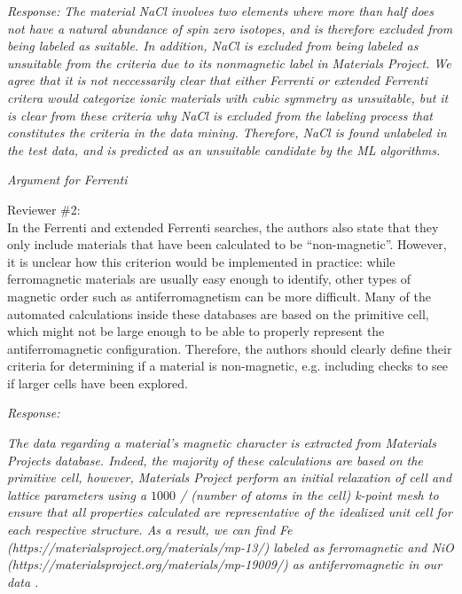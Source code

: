 \documentclass[11pt, a4paper]{letter} %
\begin{document}
\textit{Response:} 
\textit{The material NaCl involves two elements where more than half does not have a natural abundance of spin zero isotopes, and is therefore excluded from being labeled as suitable. In addition, NaCl is excluded from being labeled as unsuitable from the criteria due to its nonmagnetic label in Materials Project. We agree that it is not neccessarily clear that either Ferrenti or extended Ferrenti critera would categorize ionic materials with cubic symmetry as unsuitable, but it is clear from these criteria why NaCl is excluded from the labeling process that constitutes the criteria in the data mining. Therefore, NaCl is found unlabeled in the test data, and is predicted as an unsuitable candidate by the ML algorithms.}

\textit{Argument for Ferrenti}  

Reviewer \#2: \\
In the Ferrenti and extended Ferrenti searches, the authors also state that they only include materials that have been calculated to be “non-magnetic”. However, it is unclear how this criterion would be implemented in practice: while ferromagnetic materials are usually easy enough to identify, other types of magnetic order such as antiferromagnetism can be more difficult. Many of the automated calculations inside these databases are based on the primitive cell, which might not be large enough to be able to properly represent the antiferromagnetic configuration. Therefore, the authors should clearly define their criteria for determining if a material is non-magnetic, e.g. including checks to see if larger cells have been explored.

\textit{Response:}

\textit{The data regarding a material's magnetic character is extracted from Materials Projects database. Indeed, the majority of these calculations are based on the primitive cell, however, Materials Project perform an initial relaxation of cell and lattice parameters using a $1000$ / (number of atoms in the cell) k-point mesh to ensure that all properties calculated are representative of the idealized unit cell for each respective structure. As a result, we can find Fe (https://materialsproject.org/materials/mp-13/) labeled as ferromagnetic and NiO (https://materialsproject.org/materials/mp-19009/) as antiferromagnetic in our data .}
\end{document}
